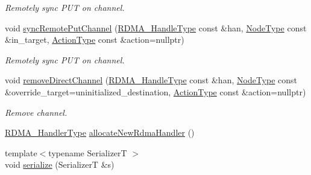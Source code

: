 \begin{DoxyCompactItemize}
\begin{DoxyCompactList}\small\item\em Remotely sync P\+UT on channel. \end{DoxyCompactList}\item 
void \hyperlink{structvt_1_1rdma_1_1_r_d_m_a_manager_aae382995709cd7827f256f9d5f3e45e4}{sync\+Remote\+Put\+Channel} (\hyperlink{namespacevt_a10442579ec4e7ebef223818e64bcf908}{R\+D\+M\+A\+\_\+\+Handle\+Type} const \&han, \hyperlink{namespacevt_a866da9d0efc19c0a1ce79e9e492f47e2}{Node\+Type} const \&in\+\_\+target, \hyperlink{namespacevt_ae0a5a7b18cc99d7b732cb4d44f46b0f3}{Action\+Type} const \&action=nullptr)
\begin{DoxyCompactList}\small\item\em Remotely sync P\+UT on channel. \end{DoxyCompactList}\item 
void \hyperlink{structvt_1_1rdma_1_1_r_d_m_a_manager_a9767f9beafd9a352ae2b9f0a189f7346}{remove\+Direct\+Channel} (\hyperlink{namespacevt_a10442579ec4e7ebef223818e64bcf908}{R\+D\+M\+A\+\_\+\+Handle\+Type} const \&han, \hyperlink{namespacevt_a866da9d0efc19c0a1ce79e9e492f47e2}{Node\+Type} const \&override\+\_\+target=uninitialized\+\_\+destination, \hyperlink{namespacevt_ae0a5a7b18cc99d7b732cb4d44f46b0f3}{Action\+Type} const \&action=nullptr)
\begin{DoxyCompactList}\small\item\em Remove channel. \end{DoxyCompactList}\item 
\hyperlink{namespacevt_a9530efb893c0f3846e8ac5f0507e0f49}{R\+D\+M\+A\+\_\+\+Handler\+Type} \hyperlink{structvt_1_1rdma_1_1_r_d_m_a_manager_a9b393c6dbd360c0b7bfb899e3fc0451b}{allocate\+New\+Rdma\+Handler} ()
\item 
{\footnotesize template$<$typename SerializerT $>$ }\\void \hyperlink{structvt_1_1rdma_1_1_r_d_m_a_manager_a3836ae3598530ab0c5486695f4fcf180}{serialize} (SerializerT \&s)
\end{DoxyCompactItemize}
